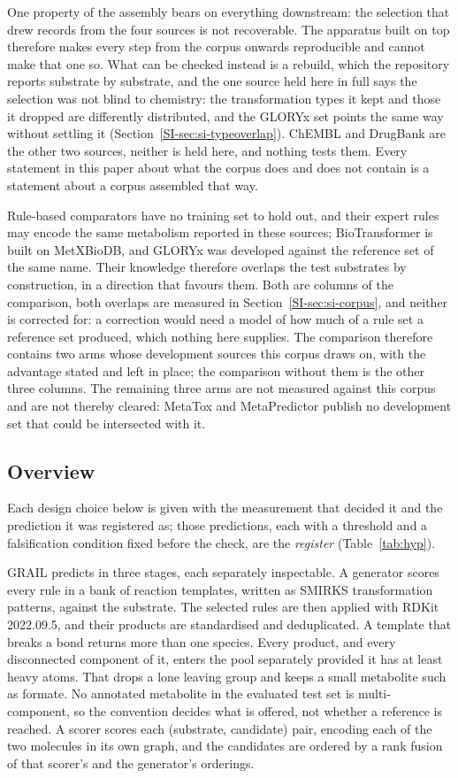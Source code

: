 One property of the assembly bears on everything downstream: the selection that drew records from
the four sources is not recoverable.  The apparatus built on top therefore makes every
step from the corpus onwards reproducible and cannot make that one so. What can be checked instead is a rebuild, which the repository reports substrate by substrate, and the one source held here in full says the selection was not blind to chemistry: the transformation types it kept and those it dropped are differently distributed, and the GLORYx set points the same way without settling it (Section~\ref{SI-sec:si-typeoverlap}).
ChEMBL and DrugBank are the other two sources, neither is held here, and nothing tests them. Every
statement in this paper about what the corpus does and does not contain is a statement about a
corpus assembled that way.

Rule-based comparators have
no training set to hold out, and their expert rules may encode the same metabolism reported in
these sources; BioTransformer is built on MetXBioDB, and GLORYx was developed against the
reference set of the same name. Their knowledge therefore overlaps the test substrates by construction, in a direction that
favours them. Both are columns of the comparison, both overlaps are measured in
Section~\ref{SI-sec:si-corpus}, and neither is corrected for: a correction would need a model of
how much of a rule set a reference set produced, which nothing here supplies. The comparison
therefore contains two arms whose development sources this corpus draws on, with the advantage
stated and left in place; the comparison without them is the other three columns.
The remaining three arms are not measured against this corpus and are not thereby cleared:
MetaTox and MetaPredictor publish no development set that could be intersected with it.
\subsection{Overview}

Each design choice below is given with the measurement that decided it and the prediction it was registered as; those predictions, each with a threshold and a falsification condition fixed before the check, are the \emph{register} (Table~\ref{tab:hyp}).

GRAIL predicts in three stages, each separately inspectable. A generator scores every rule in a
bank of \numBankRules{} reaction templates, written as SMIRKS transformation patterns, against
the substrate. The selected rules are then
applied with RDKit 2022.09.5, and their products are
standardised \citep{Hahnke_2018, Mansouri_2024} and deduplicated. A template that breaks a bond returns more than one species. Every product, and every disconnected
component of it, enters the pool separately provided it has at least \numFragmentFloorWord{} heavy
atoms. That drops a lone leaving group and keeps a small metabolite such as formate. No annotated
metabolite in the evaluated test set is multi-component, so the convention decides what is offered,
not whether a reference is reached. A scorer scores each
(substrate, candidate) pair, encoding each of the two molecules in its own graph, and the candidates are ordered by a rank fusion of that scorer's and the generator's
orderings.

